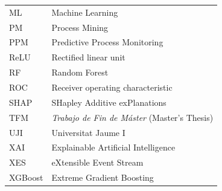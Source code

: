 \documentclass[a4paper,11pt,oneside]{book}
\begin{document}
\begin{longtable}{@{}p{3.4cm}p{11.2cm}@{}}
ML & Machine Learning \\
PM & Process Mining \\
PPM & Predictive Process Monitoring \\
ReLU & Rectified linear unit \\
RF & Random Forest \\
ROC & Receiver operating characteristic \\
SHAP & SHapley Additive exPlanations \\
TFM & \emph{Trabajo de Fin de M\'aster} (Master's Thesis) \\
UJI & Universitat Jaume I \\
XAI & Explainable Artificial Intelligence \\
XES & eXtensible Event Stream \\
XGBoost & Extreme Gradient Boosting \\
\end{longtable}

\mainmatter
\pagestyle{headings}








\backmatter
\renewcommand{\bibname}{References}


\end{document}
